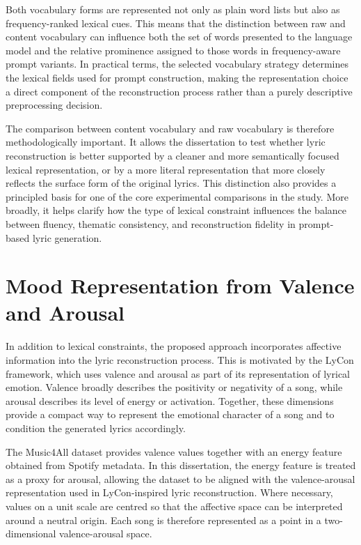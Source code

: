 Both vocabulary forms are represented not only as plain word lists but also as frequency-ranked lexical cues. This means that the distinction between raw and content vocabulary can influence both the set of words presented to the language model and the relative prominence assigned to those words in frequency-aware prompt variants. In practical terms, the selected vocabulary strategy determines the lexical fields used for prompt construction, making the representation choice a direct component of the reconstruction process rather than a purely descriptive preprocessing decision.

The comparison between content vocabulary and raw vocabulary is therefore methodologically important. It allows the dissertation to test whether lyric reconstruction is better supported by a cleaner and more semantically focused lexical representation, or by a more literal representation that more closely reflects the surface form of the original lyrics. This distinction also provides a principled basis for one of the core experimental comparisons in the study. More broadly, it helps clarify how the type of lexical constraint influences the balance between fluency, thematic consistency, and reconstruction fidelity in prompt-based lyric generation.

\section{Mood Representation from Valence and Arousal}

In addition to lexical constraints, the proposed approach incorporates affective information into the lyric reconstruction process. This is motivated by the LyCon framework, which uses valence and arousal as part of its representation of lyrical emotion. Valence broadly describes the positivity or negativity of a song, while arousal describes its level of energy or activation. Together, these dimensions provide a compact way to represent the emotional character of a song and to condition the generated lyrics accordingly.

The Music4All dataset provides valence values together with an energy feature obtained from Spotify metadata. In this dissertation, the energy feature is treated as a proxy for arousal, allowing the dataset to be aligned with the valence-arousal representation used in LyCon-inspired lyric reconstruction. Where necessary, values on a unit scale are centred so that the affective space can be interpreted around a neutral origin. Each song is therefore represented as a point in a two-dimensional valence-arousal space.

